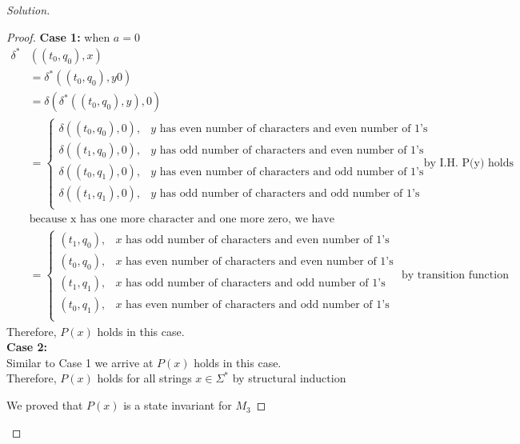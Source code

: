 \documentclass[11pt]{article}
\theoremstyle{plain}%
\theoremstyle{definition}
\theoremstyle{remark}
\newenvironment{solution}
  {\begin{proof}[Solution]}
  {\end{proof}}
\begin{document}
\begin{enumerate}
\begin{solution}
\begin{proof}
    \textbf{Case 1:} when $a=0$\\
    \begin{align*}
      \delta^* &((t_0, q_0), x) \\
      &= \delta^* ((t_0, q_0), y0) \\
      &= \delta( \delta^*((t_0, q_0), y), 0) \\
      &= \begin{cases}
        \delta((t_0, q_0), 0), & y \text{ has even number of characters and even number of 1's} \\
        \delta((t_1, q_0), 0), & y \text{ has odd number of characters and even number of 1's} \\
        \delta((t_0, q_1), 0), & y \text{ has even number of characters and odd number of 1's} \\
        \delta((t_1, q_1), 0), & y \text{ has odd number of characters and odd number of 1's} \\
      \end{cases} \text{ by I.H. P(y) holds}\\
      & \text{because x has one more character and one more zero, we have}\\
      &= \begin{cases}
        (t_1, q_0), & x \text{ has odd number of characters and even number of 1's} \\
        (t_0, q_0), & x \text{ has even number of characters and even number of 1's} \\
        (t_1, q_1), & x \text{ has odd number of characters and odd number of 1's} \\
        (t_0, q_1), & x \text{ has even number of characters and odd number of 1's} \\
      \end{cases} \text{ by transition function}
    \end{align*}
    Therefore, $P(x)$ holds in this case.\\
    \textbf{Case 2:}\\
    Similar to Case 1 we arrive at $P(x)$ holds in this case. \\
    Therefore, $P(x)$ holds for all strings $x\in \Sigma^*$ by structural induction

    We proved that $P(x)$ is a state invariant for $M_3$


  \end{proof}

\end{solution}
\end{enumerate}
\end{document}
